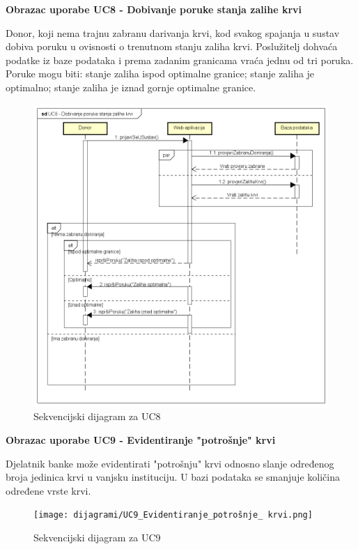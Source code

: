 \textbf{Obrazac uporabe UC8 - Dobivanje poruke stanja zalihe krvi}

Donor, koji nema trajnu zabranu darivanja krvi, kod svakog spajanja u sustav dobiva poruku u ovisnosti o trenutnom stanju zaliha krvi. Poslužitelj dohvaća podatke iz baze podataka i prema zadanim granicama vraća jednu od tri poruka. Poruke mogu biti: stanje zaliha ispod optimalne granice; stanje zaliha je optimalno; stanje zaliha je iznad gornje optimalne granice.

\begin{figure}[H]
	\centering
	\includegraphics[width=\textwidth, scale=0.4]{dijagrami/UC8_Dobivanje poruke stanja zalihe krvi.png}
	\caption{Sekvencijski dijagram za UC8}
	\label{fig:UC8_Dobivanje poruke stanja zalihe krvi}
\end{figure}
\eject

\textbf{Obrazac uporabe UC9 - Evidentiranje "potrošnje" krvi}

Djelatnik banke može evidentirati "potrošnju" krvi odnosno slanje određenog broja jedinica krvi u vanjsku instituciju. U bazi podataka se smanjuje količina određene vrste krvi.

\begin{figure}[H]
	\centering
	\texttt{[image: dijagrami/UC9\_Evidentiranje\_potrošnje\_ krvi.png]}
	\caption{Sekvencijski dijagram za UC9}
\end{figure}

